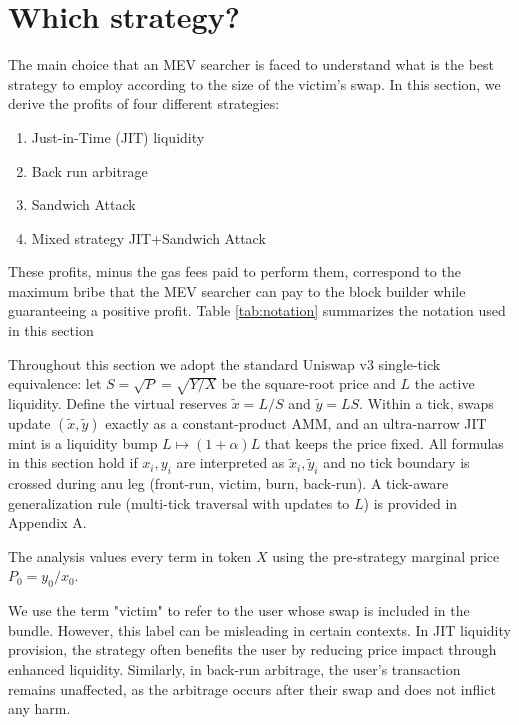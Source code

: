 \documentclass[a4paper,11pt]{article}
\begin{document}
\section{Which strategy?}
The main choice that an MEV searcher is faced to understand what is the best strategy to employ according to the size of the victim's swap. In this section, we derive the profits of four different strategies:
\begin{enumerate}
    \item Just-in-Time (JIT) liquidity
    \item Back run arbitrage
    \item Sandwich Attack
    \item Mixed strategy JIT+Sandwich Attack
\end{enumerate}
These profits, minus the gas fees paid to perform them, correspond to the maximum bribe that the MEV searcher can pay to the block builder while guaranteeing a positive profit.
Table \ref{tab:notation} summarizes the notation used in this section

Throughout this section we adopt the standard Uniswap v3 single-tick equivalence: let $S=\sqrt{P}=\sqrt{Y/X}$ be the square-root price and $L$ the active liquidity. Define the virtual reserves $\tilde{x}=L/S$  and $\tilde{y}=LS$. Within a tick, swaps update $(\tilde{x},\tilde{y})$ exactly as a constant-product AMM, and an ultra-narrow JIT mint is a liquidity bump $L\mapsto(1+\alpha)L$ that keeps the price fixed. All formulas in this section hold if  $x_i,y_i$ are interpreted as $\tilde{x}_i,\tilde{y}_i$ and no tick boundary is crossed during anu leg (front-run, victim, burn, back-run). A tick-aware generalization rule (multi-tick traversal with updates to $L$) is provided in Appendix A.

The analysis values every term in token $X$ using the pre‑strategy marginal price $P_0 = y_0/x_0$.

We use the term "victim" to refer to the user whose swap is included in the bundle. However, this label can be misleading in certain contexts. In JIT liquidity provision, the strategy often benefits the user by reducing price impact through enhanced liquidity. Similarly, in back-run arbitrage, the user's transaction remains unaffected, as the arbitrage occurs after their swap and does not inflict any harm.
\end{document}
